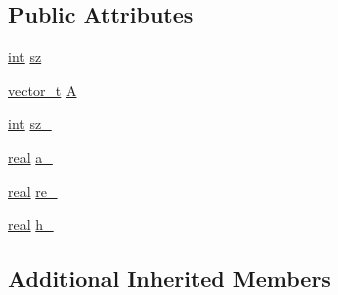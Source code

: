 \subsection*{Public Attributes}
\begin{DoxyCompactItemize}
\item 
\hyperlink{classint}{int} \hyperlink{structsystem__operator_a62ee884c4912594a527b51645c50f703}{sz}
\item 
\hyperlink{linear__solvers__test_8cpp_a8d0acf9490f363fba134e7c88d751014}{vector\-\_\-t} \hyperlink{structsystem__operator_ad65d4629ea6454c220afcf8ae37e7056}{A}
\item 
\hyperlink{classint}{int} \hyperlink{structsystem__operator_afd5792e0496aa8cb5856c55ed2fe6bef}{sz\-\_\-}
\item 
\hyperlink{linear__solvers__test_8cpp_a16870095f424ead722dee97d866cc328}{real} \hyperlink{structsystem__operator_a56a3b4eb15af35520fd5e7f7c53e9867}{a\-\_\-}
\item 
\hyperlink{linear__solvers__test_8cpp_a16870095f424ead722dee97d866cc328}{real} \hyperlink{structsystem__operator_af9bc7a7d8dd1c6f5ad512d991ba89c6b}{re\-\_\-}
\item 
\hyperlink{linear__solvers__test_8cpp_a16870095f424ead722dee97d866cc328}{real} \hyperlink{structsystem__operator_a67111e362063fae7530d24c73a24e8ec}{h\-\_\-}
\end{DoxyCompactItemize}
\subsection*{Additional Inherited Members}


